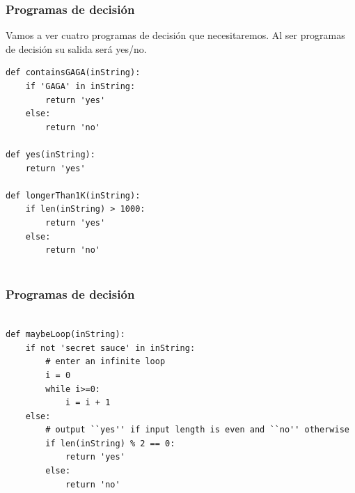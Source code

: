\documentclass[xcolor=table]{beamer}
\begin{document}
\begin{frame}  [fragile] \frametitle{Programas de decisión}  \scriptsize  

Vamos a ver cuatro programas de decisión que necesitaremos. Al ser programas de decisión su salida será yes/no.\\

  \begin{verbatim}
def containsGAGA(inString): 
    if 'GAGA' in inString: 
        return 'yes' 
    else: 
        return 'no'

def yes(inString): 
    return 'yes'   

def longerThan1K(inString): 
    if len(inString) > 1000:
        return 'yes'
    else:
        return 'no' 


\end{verbatim}    
\end{frame} 

\begin{frame}  [fragile] \frametitle{Programas de decisión}  \scriptsize  
  \begin{verbatim}

def maybeLoop(inString): 
    if not 'secret sauce' in inString:
        # enter an infinite loop
        i = 0
        while i>=0:
            i = i + 1
    else:
        # output ``yes'' if input length is even and ``no'' otherwise
        if len(inString) % 2 == 0:
            return 'yes'
        else:
            return 'no' 
\end{verbatim}    
\end{frame} 
\end{document}

